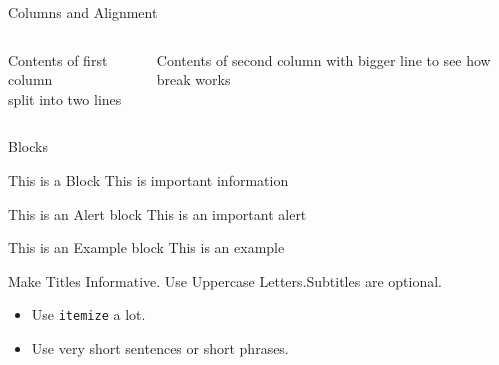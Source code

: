\documentclass{beamer}
\begin{document}
\begin{frame}{Columns and Alignment}
     \begin{columns}[t] %
     \begin{column}[T]{5cm} %
     Contents of first column \\ split into two lines
     \end{column}
     \begin{column}[T]{5cm} %
	Contents of second column with bigger line to see how break works
     \end{column}
     \end{columns}
\end{frame}



\begin{frame}{Blocks}
 
   \begin{block}{This is a Block}
      This is important information
   \end{block}
 
   \begin{alertblock}{This is an Alert block}
   This is an important alert
   \end{alertblock}
 
   \begin{exampleblock}{This is an Example block}
   This is an example 
   \end{exampleblock}
 
\end{frame}





\begin{frame}{Make Titles Informative. Use Uppercase Letters.}{Subtitles are optional.}

  \begin{itemize}
  \item
    Use \texttt{itemize} a lot.
  \item
    Use very short sentences or short phrases.
  \end{itemize}
\end{frame}
\end{document}
